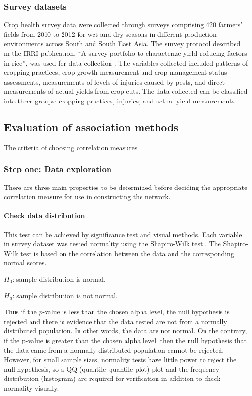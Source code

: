 \documentclass[a4paper]{article}
\begin{document}
\subsubsection*{Survey datasets}
Crop health survey data were collected through surveys comprising 420 farmers' fields from 2010 to 2012 for wet and dry seasons in different production environments across South and South East Asia. The survey protocol described in the IRRI publication, ``A survey  portfolio to characterize yield-reducing factors in rice'', was used for data collection \citep{Savarysurvey2009}. The variables collected included patterns of cropping practices, crop growth measurement and crop management status assessments, measurements of levels of injuries caused by pests, and direct measurements of actual yields from crop cuts. The data collected can be classified into three groups: cropping practices, injuries, and actual yield measurements.

\subsection*{Evaluation of association methods}
The criteria of choosing correlation measures 
\subsubsection*{Step one: Data exploration}
There are three main properties to be determined before deciding the appropriate correlation measure for use in constructing the network. 

\paragraph{Check data distribution} This test can be achieved by significance test and visual methods. Each variable in survey dataset was tested normality using the Shapiro-Wilk test \citep{ghasemi2012normality}. The Shapiro-Wilk test is based on the correlation between the data and the corresponding normal scores.

$H_{0}$: sample distribution is normal.

$H_{a}$: sample distribution is not normal.

Thus if the $p$-value is less than the chosen alpha level, the null hypothesis is rejected and there is evidence that the data tested are not from a normally distributed population. In other words, the data are not normal. On the contrary, if the p-value is greater than the chosen alpha level, then the null hypothesis that the data came from a normally distributed population cannot be rejected. However, for small sample sizes, normality tests have little power to reject the null hypothesis, so a QQ (quantile--quantile plot) plot and the frequency distribution (histogram) are required for verification in addition to check normality visually.
\end{document}
